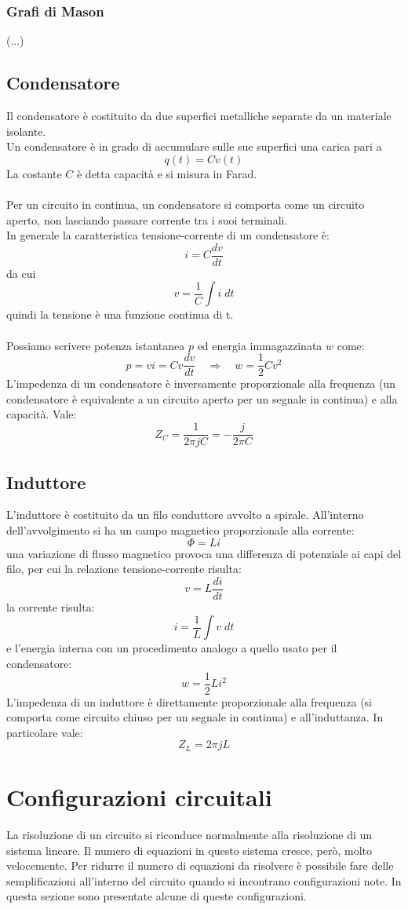 \documentclass{article}
\begin{document}
\subsubsection{Grafi di Mason}
(...)


\subsection{Condensatore}
Il condensatore è costituito da due superfici metalliche separate da un materiale isolante.\\
Un condensatore è in grado di accumulare sulle sue superfici una carica pari a
$$ q(t)=Cv(t) $$
La costante $C$ è detta capacità e si misura in Farad.\\\\
Per un circuito in continua, un condensatore si comporta come un circuito aperto, non lasciando passare corrente tra i suoi terminali.\\
In generale la caratteristica tensione-corrente di un condensatore è:
$$ i=C\frac{dv}{dt} $$
da cui
$$ v=\frac{1}{C}\int i\;dt $$
quindi la tensione è una funzione continua di t.\\\\
Possiamo scrivere potenza istantanea $p$ ed energia immagazzinata $w$ come:
$$ p=vi=Cv\frac{dv}{dt} \quad\Rightarrow\quad w=\frac{1}{2}Cv^2 $$
L'impedenza di un condensatore è inversamente proporzionale alla frequenza (un condensatore è equivalente a un circuito aperto per un segnale in continua) e alla capacità. Vale:
$$ Z_C = \frac{1}{2\pi j C} = -\frac{j}{2\pi C} $$

\subsection{Induttore}
L'induttore è costituito da un filo conduttore avvolto a spirale. All'interno dell'avvolgimento si ha un campo magnetico proporzionale alla corrente:
$$ \Phi=Li $$
una variazione di flusso magnetico provoca una differenza di potenziale ai capi del filo, per cui la relazione tensione-corrente risulta:
$$ v=L\frac{di}{dt} $$
la corrente risulta:
$$ i=\frac{1}{L}\int v\;dt $$
e l'energia interna con un procedimento analogo a quello usato per il condensatore:
$$ w=\frac{1}{2}Li^2 $$
L'impedenza di un induttore è direttamente proporzionale alla frequenza (si comporta come circuito chiuso per un segnale in continua) e all'induttanza. In particolare vale:
$$ Z_L=2\pi j L $$




\newpage
\section{Configurazioni circuitali}
La risoluzione di un circuito si riconduce normalmente alla risoluzione di un sistema lineare. Il numero di equazioni in questo sistema cresce, però, molto velocemente. Per ridurre il numero di equazioni da risolvere è possibile fare delle semplificazioni all'interno del circuito quando si incontrano configurazioni note. In questa sezione sono presentate alcune di queste configurazioni.
\end{document}
